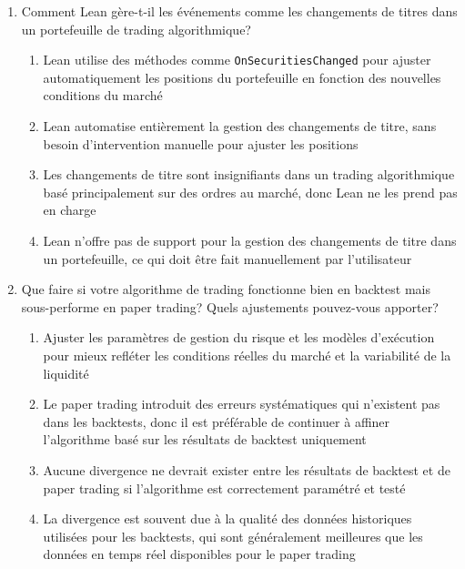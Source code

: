\documentclass[a4paper,12pt]{article}
\begin{document}
\begin{enumerate}
    \item Comment Lean gère-t-il les événements comme les changements de titres dans un portefeuille de trading algorithmique?
    \begin{enumerate}[label=(\Alph*)]
        \item Lean utilise des méthodes comme \texttt{OnSecuritiesChanged} pour ajuster automatiquement les positions du portefeuille en fonction des nouvelles conditions du marché
        \item Lean automatise entièrement la gestion des changements de titre, sans besoin d'intervention manuelle pour ajuster les positions
        \item Les changements de titre sont insignifiants dans un trading algorithmique basé principalement sur des ordres au marché, donc Lean ne les prend pas en charge
        \item Lean n'offre pas de support pour la gestion des changements de titre dans un portefeuille, ce qui doit être fait manuellement par l'utilisateur
    \end{enumerate}

    \item Que faire si votre algorithme de trading fonctionne bien en backtest mais sous-performe en paper trading? Quels ajustements pouvez-vous apporter?
    \begin{enumerate}[label=(\Alph*)]
        \item Ajuster les paramètres de gestion du risque et les modèles d'exécution pour mieux refléter les conditions réelles du marché et la variabilité de la liquidité
        \item Le paper trading introduit des erreurs systématiques qui n'existent pas dans les backtests, donc il est préférable de continuer à affiner l'algorithme basé sur les résultats de backtest uniquement
        \item Aucune divergence ne devrait exister entre les résultats de backtest et de paper trading si l'algorithme est correctement paramétré et testé
        \item La divergence est souvent due à la qualité des données historiques utilisées pour les backtests, qui sont généralement meilleures que les données en temps réel disponibles pour le paper trading
    \end{enumerate}


\end{enumerate}
\end{document}
